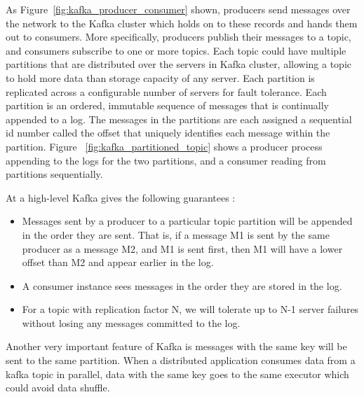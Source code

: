 As Figure~\ref{fig:kafka_producer_consumer} shown, producers send messages over the network to the Kafka cluster which holds on to these records and hands them out to consumers. More specifically, producers publish their messages to a topic, and consumers subscribe to one or more topics. Each topic could have multiple partitions that are distributed over the servers in Kafka cluster, allowing a topic to hold more data than storage capacity of any server. Each partition is replicated across a configurable number of servers for fault tolerance. Each partition is an ordered, immutable sequence of messages that is continually appended to a log. The messages in the partitions are each assigned a sequential id number called the offset that uniquely identifies each message within the partition.  Figure ~\ref{fig:kafka_partitioned_topic} shows a producer process appending to the logs for the two partitions, and a consumer reading from partitions sequentially. 

At a high-level Kafka gives the following guarantees \cite{Kafka}:
\begin{itemize}
  \item Messages sent by a producer to a particular topic partition will be appended in the order they are sent. That is, if a message M1 is sent by the same producer as a message M2, and M1 is sent first, then M1 will have a lower offset than M2 and appear earlier in the log. 
  \item A consumer instance sees messages in the order they are stored in the log.
  \item For a topic with replication factor N, we will tolerate up to N-1 server failures without losing any messages committed to the log.
\end{itemize}


Another very important feature of Kafka is messages with the same key will be sent to the same partition. When a distributed application consumes data from a kafka topic in parallel, data with the same key goes to the same executor which could avoid data shuffle.


